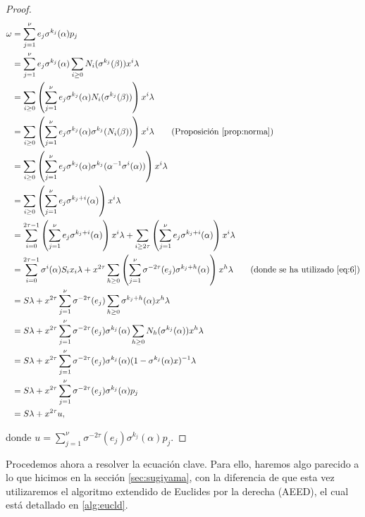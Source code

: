 \begin{proof}
\begin{align*}
\omega &= \sum_{j=1}^{\nu}e_j\sigma^{k_j}(\alpha)p_j \\
       &= \sum_{j=1}^{\nu}e_j\sigma^{k_j}(\alpha)\sum_{i \geq 0}N_i(\sigma^{k_j}(\beta))x^{i}\lambda \\
       &= \sum_{i \geq 0}\left( \sum_{j=1}^{\nu}e_j\sigma^{k_j}(\alpha)N_i(\sigma^{k_j}(\beta))\right)x^i\lambda \\
       &= \sum_{i \geq 0}\left( \sum_{j=1}^{\nu}e_j\sigma^{k_j}(\alpha)\sigma^{k_j}(N_i(\beta))\right)x^i\lambda \qquad (\text{Proposición \ref{prop:norma}})\\
       &= \sum_{i \geq 0}\left( \sum_{j=1}^{\nu}e_j\sigma^{k_j}(\alpha)\sigma^{k_j}(\alpha^{-1}\sigma^i(\alpha))\right)x^i\lambda \\
       &= \sum_{i \geq 0}\left(\sum_{j=1}^{\nu}e_j\sigma^{k_j+i}(\alpha)\right)x^i\lambda \\
       &= \sum_{i=0}^{2\tau - 1}\left(\sum_{j=1}^{\nu}e_j\sigma^{k_j+i}(\alpha)\right)x^i\lambda + \sum_{i \geq 2\tau}\left(\sum_{j=1}^{\nu}e_j\sigma^{k_j+i}(\alpha)\right)x^i\lambda \\
       &=  \sum_{i=0}^{2\tau - 1} \sigma^i(\alpha)S_ix_i\lambda + x^{2\tau}\sum_{h \geq 0}\left(\sum_{j=1}^{\nu} \sigma^{-2\tau}(e_j)\sigma^{k_j+h}(\alpha)\right)x^h\lambda \qquad (\text{donde se ha utilizado \eqref{eq:6}}) \\
       &= S\lambda + x^{2\tau}\sum_{j=1}^{\nu}\sigma^{-2\tau}(e_j)\sum_{h \geq 0}\sigma^{k_j + h}(\alpha)x^h\lambda \\
       &= S\lambda + x^{2\tau}\sum_{j=1}^{\nu}\sigma^{-2\tau}(e_j)\sigma^{k_j}(\alpha)\sum_{h \geq 0}N_h(\sigma^{k_j}(\alpha))x^h\lambda \\
       &= S\lambda +  x^{2\tau}\sum_{j=1}^{\nu}\sigma^{-2\tau}(e_j)\sigma^{k_j}(\alpha)(1 - \sigma^{k_j}(\alpha)x)^{-1}\lambda \\
       &= S\lambda +  x^{2\tau}\sum_{j=1}^{\nu}\sigma^{-2\tau}(e_j)\sigma^{k_j}(\alpha)p_j \\
       &= S\lambda + x^{2\tau}u,
\end{align*}

donde $u = \sum_{j=1}^{\nu}\sigma^{-2\tau}(e_j)\sigma^{k_j}(\alpha)p_j$.

\end{proof}

Procedemos ahora a resolver la ecuación clave. Para ello, haremos algo parecido a lo que hicimos en la sección \ref{sec:sugiyama}, con la diferencia de que esta vez utilizaremos el algoritmo extendido de Euclides por la derecha (AEED), el cual está detallado en \ref{alg:eucld}.

